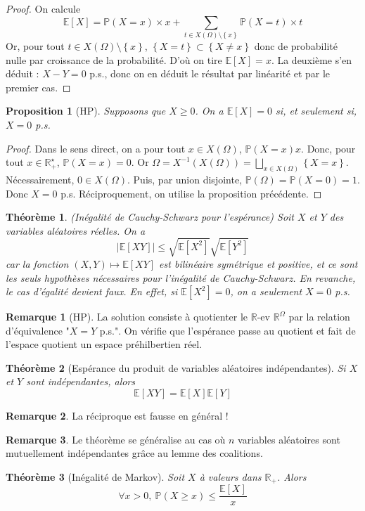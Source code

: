 \documentclass[french]{book}
\renewcommand{\P}{\mathbb{P}}
\newcommand{\R}{\mathbb{R}}
\newcommand{\E}{\mathbb{E}}
\newcommand{\st}{^\star}
\newcommand{\inv}{^{-1}}
\theoremstyle{plain}
\newtheorem{thm}{Théorème}[chapter]
\newtheorem{prop}{Proposition}[chapter]
\theoremstyle{definition}
\newtheorem{rmq}{Remarque}[chapter]
\theoremstyle{remark}
\begin{document}
\begin{proof}
	On calcule $$\E[X]=\P(X=x)\times x + \sum_{t\in X(\Omega)\setminus\left\{x\right\}}\P(X=t)\times t$$ Or, pour tout $t\in X(\Omega)\setminus\left\{x\right\}$, $\left\{X=t\right\}\subset \left\{X\ne x\right\}$ donc de probabilité nulle par croissance de la probabilité. D'où on tire $\E[X]=x$. La deuxième s'en déduit : $X-Y=0$ p.s., donc on en déduit le résultat par linéarité et par le premier cas.
\end{proof}
\begin{prop}[HP]
	Supposons que $X\geqslant 0$. On a $\E[X]=0$ si, et seulement si, $X=0$ p.s.
\end{prop}
\begin{proof}
	Dans le sens direct, on a pour tout $x\in X(\Omega)$, $\P(X=x)x$. Donc, pour tout $x\in\R_+\st$, $\P(X=x)=0$. Or $\Omega=X\inv(X(\Omega))=\displaystyle \bigsqcup_{x \in X(\Omega)}\left\{X=x\right\}$. Nécessairement, $0\in X(\Omega)$. Puis, par union disjointe, $\P(\Omega)=\P(X=0)=1$. Donc $X=0$ p.s. Réciproquement, on utilise la proposition précédente.
\end{proof}
\begin{thm}(Inégalité de Cauchy-Schwarz pour l'espérance)
	Soit $X$ et $Y$ des variables aléatoires réelles. On a $$\left\lvert\E[XY]\right\rvert \leqslant \sqrt{\E[X^2]}\sqrt{\E[Y^2]}$$ car la fonction $(X,Y)\mapsto\E[XY]$ est bilinéaire symétrique et positive, et ce sont les seuls hypothèses nécessaires pour l'inégalité de Cauchy-Schwarz. En revanche, le cas d'égalité devient faux. En effet, si $\E[X^2]=0$, on a seulement $X=0$ p.s.
\end{thm}
\begin{rmq}[HP] La solution consiste à quotienter le $\R$-ev $\R^\Omega$ par la relation d'équivalence "$X=Y$ p.s.". On vérifie que l'espérance passe au quotient et fait de l'espace quotient un espace préhilbertien réel. \end{rmq}
\begin{thm}[Espérance du produit de variables aléatoires indépendantes]
	Si $X$ et $Y$ sont indépendantes, alors $$\E[XY]=\E[X]\E[Y]$$
\end{thm}
\begin{rmq} La réciproque est fausse en général ! \end{rmq}
\begin{rmq} Le théorème se généralise au cas où $n$ variables aléatoires sont mutuellement indépendantes grâce au lemme des coalitions. \end{rmq}
\begin{thm}[Inégalité de Markov]
	Soit $X$ à valeurs dans $\R_+$. Alors $$\forall x>0, \ \P(X\geqslant x)\leqslant\frac{\E[X]}{x}$$
\end{thm}
\end{document}
